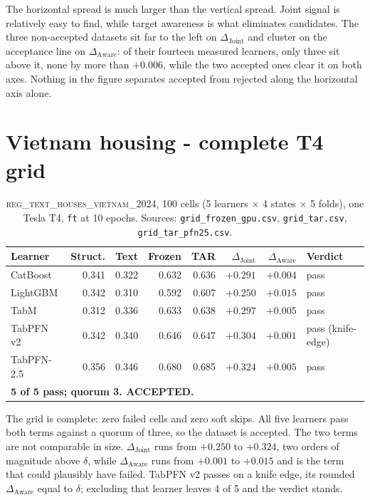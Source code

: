 \documentclass{article}
\newcommand{\djoint}{\Delta_{\text{Joint}}}
\newcommand{\daware}{\Delta_{\text{Aware}}}
\begin{document}
\noindent The horizontal spread is much larger than the vertical spread. Joint signal is relatively
easy to find, while target awareness is what eliminates candidates. The three non-accepted
datasets sit far to the left on $\djoint$ and cluster on the acceptance line on $\daware$: of their
fourteen measured learners, only three sit above it, none by more than $+0.006$, while the two
accepted ones clear it on both axes. Nothing in the figure separates accepted from rejected along
the horizontal axis alone.



\section{Vietnam housing - complete T4 grid}
\label{app:vietnam}

\begin{table}[H]
\centering\small
\caption{\textsc{reg\_text\_houses\_vietnam\_2024}, 100 cells (5 learners $\times$ 4 states
$\times$ 5 folds), one Tesla T4, \texttt{ft} at 10 epochs. Sources:
\texttt{grid\_frozen\_gpu.csv}, \texttt{grid\_tar.csv}, \texttt{grid\_tar\_pfn25.csv}.}
\begin{tabular}{lrrrrrrl}
\toprule
Learner & Struct. & Text & Frozen & TAR & $\djoint$ & $\daware$ & Verdict \\
\midrule
CatBoost   & 0.341 & 0.322 & 0.632 & 0.636 & $+0.291$ & $+0.004$ & pass \\
LightGBM   & 0.342 & 0.310 & 0.592 & 0.607 & $+0.250$ & $+0.015$ & pass \\
TabM       & 0.312 & 0.336 & 0.633 & 0.638 & $+0.297$ & $+0.005$ & pass \\
TabPFN v2  & 0.342 & 0.340 & 0.646 & 0.647 & $+0.304$ & $+0.001$ & pass (knife-edge) \\
TabPFN-2.5 & 0.356 & 0.346 & 0.680 & 0.685 & $+0.324$ & $+0.005$ & pass \\
\midrule
\multicolumn{8}{l}{\textbf{5 of 5 pass; quorum 3. ACCEPTED.}} \\
\bottomrule
\end{tabular}
\end{table}

\noindent The grid is complete: zero failed cells and zero soft skips. All five learners pass both terms
against a quorum of three, so the dataset is accepted. The two terms are not comparable in
size. $\djoint$ runs from $+0.250$ to $+0.324$, two orders of magnitude above $\delta$, while
$\daware$ runs from $+0.001$ to $+0.015$ and is the term that could plausibly have failed. TabPFN
v2 passes on a knife edge, its rounded $\daware$ equal to $\delta$; excluding that learner leaves
4 of 5 and the verdict stands.
\end{document}
